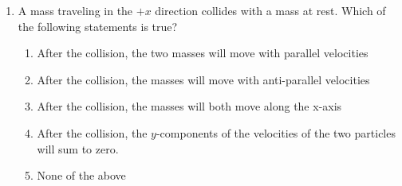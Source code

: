 \documentclass{../../../oss-apphys}
\begin{document}
\begin{multicols}{2}
\begin{enumerate}[resume,leftmargin=18pt]
  \item A mass traveling in the $+x$ direction collides with a mass at rest.
    Which of the following statements is true?
    \begin{enumerate}[noitemsep,topsep=0pt,leftmargin=18pt,label=(\Alph*)]
    \item After the collision, the two masses will move with parallel velocities
    \item After the collision, the masses will move with anti-parallel
      velocities
    \item After the collision, the masses will both move along the x-axis
    \item After the collision, the $y$-components of the velocities of the two
      particles will sum to zero.
    \item None of the above
    \end{enumerate}
  \end{enumerate}
\end{multicols}
\newpage



\end{document}
